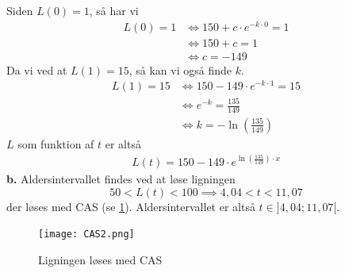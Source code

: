 \documentclass{article}
\begin{document}
Siden $L(0)=1$, så har vi 
\begin{equation*}
\begin{split}
  L(0)=1 &\iff 150 + c \cdot e^{-k \cdot 0} =1\\
  &\iff 150 + c=1\\
  &\iff c=-149
\end{split}
\end{equation*}
Da vi ved at $L(1)=15$, så kan vi også finde $k$.
\begin{equation*}
\begin{split}
  L(1)=15 &\iff 150 -149 \cdot e^{-k \cdot 1} =15\\
  &\iff e^{-k} =\frac{135}{149}\\
  &\iff k=-\ln\left(\frac{135}{149}\right) 
\end{split}
\end{equation*}
$L$ som funktion af $t$ er altså 
\begin{equation*}
\begin{split}
  L(t)=150-149 \cdot e^{\ln\left(\frac{135}{149}\right) \cdot x} 
\end{split}
\end{equation*}
\textbf{b.}
Aldersintervallet findes ved at løse ligningen 
\[
50<L(t)<100 \implies 4,04<t<11,07 
\] 
der løses med CAS (se \cref{fig:CAS2}).
Aldersintervallet er altså $t \in ]4,04;11,07[$.

\begin{figure}[H]
\begin{center}
  \texttt{[image: CAS2.png]}
\end{center}
\caption{Ligningen løses med CAS}
\label{fig:CAS2}
\end{figure}
\end{document}
